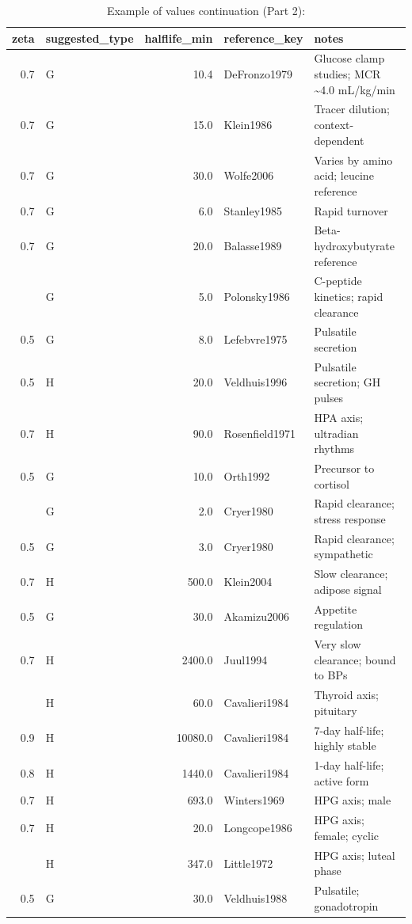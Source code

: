 \documentclass[
]{book}
\begin{document}
\begin{longtable}[t]{rlrll}
\caption{\label{tab:table-2}Example of values continuation (Part 2):}\\
\toprule
zeta & suggested\_type & halflife\_min & reference\_key & notes\\
\midrule
0.7 & G & 10.4 & DeFronzo1979 & Glucose clamp studies; MCR \textasciitilde{}4.0 mL/kg/min\\
0.7 & G & 15.0 & Klein1986 & Tracer dilution; context-dependent\\
0.7 & G & 30.0 & Wolfe2006 & Varies by amino acid; leucine reference\\
0.7 & G & 6.0 & Stanley1985 & Rapid turnover\\
0.7 & G & 20.0 & Balasse1989 & Beta-hydroxybutyrate reference\\
\addlinespace
0.5 & G & 5.0 & Polonsky1986 & C-peptide kinetics; rapid clearance\\
0.5 & G & 8.0 & Lefebvre1975 & Pulsatile secretion\\
0.5 & H & 20.0 & Veldhuis1996 & Pulsatile secretion; GH pulses\\
0.7 & H & 90.0 & Rosenfield1971 & HPA axis; ultradian rhythms\\
0.5 & G & 10.0 & Orth1992 & Precursor to cortisol\\
\addlinespace
0.5 & G & 2.0 & Cryer1980 & Rapid clearance; stress response\\
0.5 & G & 3.0 & Cryer1980 & Rapid clearance; sympathetic\\
0.7 & H & 500.0 & Klein2004 & Slow clearance; adipose signal\\
0.5 & G & 30.0 & Akamizu2006 & Appetite regulation\\
0.7 & H & 2400.0 & Juul1994 & Very slow clearance; bound to BPs\\
\addlinespace
0.7 & H & 60.0 & Cavalieri1984 & Thyroid axis; pituitary\\
0.9 & H & 10080.0 & Cavalieri1984 & 7-day half-life; highly stable\\
0.8 & H & 1440.0 & Cavalieri1984 & 1-day half-life; active form\\
0.7 & H & 693.0 & Winters1969 & HPG axis; male\\
0.7 & H & 20.0 & Longcope1986 & HPG axis; female; cyclic\\
\addlinespace
0.7 & H & 347.0 & Little1972 & HPG axis; luteal phase\\
0.5 & G & 30.0 & Veldhuis1988 & Pulsatile; gonadotropin\\

\end{longtable}
\end{document}
